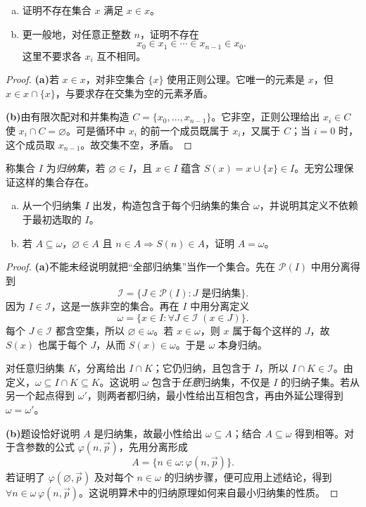 \documentclass[lang=cn,a4paper,fontset=none,zihao=false,10pt,openany,twoside]{beautybook}
\numberwithin{algorithm}{chapter}
\newcommand{\Pow}{\mathcal P}
\begin{document}
\begin{example}[正则公理排除属于关系的有限循环]
\begin{enumerate}[(a)]
\item 证明不存在集合 $x$ 满足 $x\in x$。
\item 更一般地，对任意正整数 $n$，证明不存在
\[
 x_0\in x_1\in\cdots\in x_{n-1}\in x_0.
\]
这里不要求各 $x_i$ 互不相同。
\end{enumerate}
\end{example}
\begin{proof}
\par\smallskip\noindent\textbf{(a)}\quad 若 $x\in x$，对非空集合 $\{x\}$ 使用正则公理。它唯一的元素是 $x$，但 $x\in x\cap\{x\}$，与要求存在交集为空的元素矛盾。

\par\smallskip\noindent\textbf{(b)}\quad 由有限次配对和并集构造 $C=\{x_0,\ldots,x_{n-1}\}$。它非空，正则公理给出 $x_i\in C$ 使 $x_i\cap C=\varnothing$。可是循环中 $x_i$ 的前一个成员既属于 $x_i$，又属于 $C$；当 $i=0$ 时，这个成员取 $x_{n-1}$。故交集不空，矛盾。
\end{proof}

\begin{example}[最小归纳集与数学归纳原理]
称集合 $I$ 为\emph{归纳集}，若 $\varnothing\in I$，且 $x\in I$ 蕴含 $S(x)=x\cup\{x\}\in I$。无穷公理保证这样的集合存在。
\begin{enumerate}[(a)]
\item 从一个归纳集 $I$ 出发，构造包含于每个归纳集的集合 $\omega$，并说明其定义不依赖于最初选取的 $I$。
\item 若 $A\subseteq\omega$，$\varnothing\in A$ 且 $n\in A\Rightarrow S(n)\in A$，证明 $A=\omega$。
\end{enumerate}
\end{example}
\begin{proof}
\par\smallskip\noindent\textbf{(a)}\quad 不能未经说明就把“全部归纳集”当作一个集合。先在 $\Pow(I)$ 中用分离得到
\[
 \mathcal I=\{J\in\Pow(I):J\text{ 是归纳集}\}.
\]
因为 $I\in\mathcal I$，这是一族非空的集合。再在 $I$ 中用分离定义
\[
 \omega=\{x\in I:\forall J\in\mathcal I\;(x\in J)\}.
\]
每个 $J\in\mathcal I$ 都含空集，所以 $\varnothing\in\omega$。若 $x\in\omega$，则 $x$ 属于每个这样的 $J$，故 $S(x)$ 也属于每个 $J$，从而 $S(x)\in\omega$。于是 $\omega$ 本身归纳。

对任意归纳集 $K$，分离给出 $I\cap K$；它仍归纳，且包含于 $I$，所以 $I\cap K\in\mathcal I$。由定义，$\omega\subseteq I\cap K\subseteq K$。这说明 $\omega$ 包含于\emph{任意}归纳集，不仅是 $I$ 的归纳子集。若从另一个起点得到 $\omega'$，则两者都归纳，最小性给出互相包含，再由外延公理得到 $\omega=\omega'$。

\par\smallskip\noindent\textbf{(b)}\quad 题设恰好说明 $A$ 是归纳集，故最小性给出 $\omega\subseteq A$；结合 $A\subseteq\omega$ 得到相等。对于含参数的公式 $\varphi(n,\vec p)$，先用分离形成
\[
 A=\{n\in\omega:\varphi(n,\vec p)\}.
\]
若证明了 $\varphi(\varnothing,\vec p)$ 及对每个 $n\in\omega$ 的归纳步骤，便可应用上述结论，得到 $\forall n\in\omega\,\varphi(n,\vec p)$。这说明算术中的归纳原理如何来自最小归纳集的性质。
\end{proof}
\end{document}
